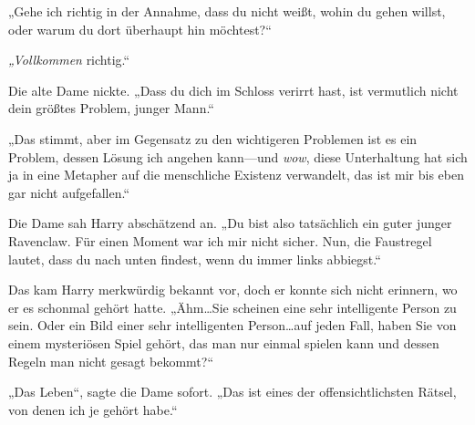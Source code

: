 „Gehe ich richtig in der Annahme, dass du nicht weißt, wohin du gehen willst, oder warum du dort überhaupt hin möchtest?“

\emph{„Vollkommen} richtig.“

Die alte Dame nickte. „Dass du dich im Schloss verirrt hast, ist vermutlich nicht dein größtes Problem, junger Mann.“

„Das stimmt, aber im Gegensatz zu den wichtigeren Problemen ist es ein Problem, dessen Lösung ich angehen kann—und \emph{wow}, diese Unterhaltung hat sich ja in eine Metapher auf die menschliche Existenz verwandelt, das ist mir bis eben gar nicht aufgefallen.“

Die Dame sah Harry abschätzend an. „Du bist also tatsächlich ein guter junger Ravenclaw. Für einen Moment war ich mir nicht sicher. Nun, die Faustregel lautet, dass du nach unten findest, wenn du immer links abbiegst.“

Das kam Harry merkwürdig bekannt vor, doch er konnte sich nicht erinnern, wo er es schonmal gehört hatte. „Ähm…Sie scheinen eine sehr intelligente Person zu sein. Oder ein Bild einer sehr intelligenten Person…auf jeden Fall, haben Sie von einem mysteriösen Spiel gehört, das man nur einmal spielen kann und dessen Regeln man nicht gesagt bekommt?“

„Das Leben“, sagte die Dame sofort. „Das ist eines der offensichtlichsten Rätsel, von denen ich je gehört habe.“

